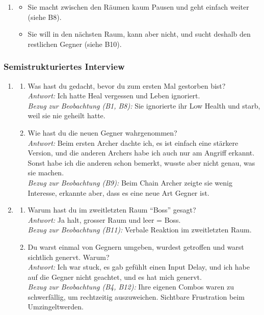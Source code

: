 \documentclass[../Main.tex]{subfiles}
\begin{document}
\begin{enumerate}[label=\textbf{B\arabic*}, leftmargin=1.5cm, itemsep=0.8em, resume]
\item
\begin{itemize}[nosep]
    \item Sie macht zwischen den Räumen kaum Pausen und geht einfach weiter (siehe B8).
    \item Sie will in den nächsten Raum, kann aber nicht, und sucht deshalb den restlichen Gegner (siehe B10).
\end{itemize}
\end{enumerate}

\subsubsection{Semistrukturiertes Interview}

\begin{enumerate}[label=\textbf{I\arabic*}, leftmargin=1.5cm, itemsep=1em]
\item
\begin{enumerate}[label=\alph*), itemsep=0.6em]
\item Was hast du gedacht, bevor du zum ersten Mal gestorben bist? \\
    \textit{Antwort:} Ich hatte Heal vergessen und Leben ignoriert. \\
    \textit{Bezug zur Beobachtung (B1, B8):} Sie ignorierte ihr Low Health und starb, weil sie nie geheilt hatte.
\item Wie hast du die neuen Gegner wahrgenommen? \\
    \textit{Antwort:} Beim ersten Archer dachte ich, es ist einfach eine stärkere Version, und die anderen Archers habe ich auch nur am Angriff erkannt. Sonst habe ich die anderen schon bemerkt, wusste aber nicht genau, was sie machen. \\
    \textit{Bezug zur Beobachtung (B9):} Beim Chain Archer zeigte sie wenig Interesse, erkannte aber, dass es eine neue Art Gegner ist.
\end{enumerate}

\item
\begin{enumerate}[label=\alph*), itemsep=0.6em]
\item Warum hast du im zweitletzten Raum \enquote{Boss} gesagt? \\
\textit{Antwort:} Ja halt, grosser Raum und leer = Boss. \\
\textit{Bezug zur Beobachtung (B11):} Verbale Reaktion im zweitletzten Raum.
\item Du warst einmal von Gegnern umgeben, wurdest getroffen und warst sichtlich genervt. Warum? \\
\textit{Antwort:} Ich war stuck, es gab gefühlt einen Input Delay, und ich habe auf die Gegner nicht geachtet, und es hat mich genervt. \\
\textit{Bezug zur Beobachtung (B4, B12):} Ihre eigenen Combos waren zu schwerfällig, um rechtzeitig auszuweichen. Sichtbare Frustration beim Umzingeltwerden.
\end{enumerate}


\end{enumerate}
\end{document}
